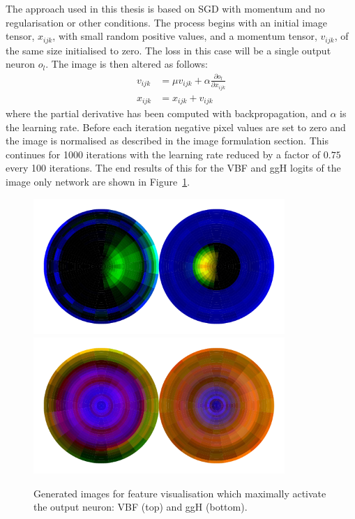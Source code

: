 The approach used in this thesis is based on SGD with momentum and no regularisation or other conditions. 
The process begins with an initial image tensor, $x_{ijk}$, with small random positive values, and a momentum tensor, $v_{ijk}$, of the same size initialised to zero.
The loss in this case will be a single output neuron $o_{l}$. The image is then altered as follows:
\begin{equation}
    \begin{split}
        v_{ijk} &= \mu{}v_{ijk} + \alpha\frac{\partial{o_{l}}}{\partial{x_{ijk}}} \\
        x_{ijk} &= x_{ijk} + v_{ijk}
    \end{split}
\end{equation} 
where the partial derivative has been computed with backpropagation, and $\alpha$ is the learning rate. Before each iteration negative pixel values are set to zero and the image is normalised as described in the image formulation section. This continues for 1000 iterations with the learning rate reduced by a factor of $0.75$ every 100 iterations. 
The end results of this for the VBF and ggH logits of the image only network are shown in Figure~\ref{fig:event_categorisation:feature_vis_vbf_ggh}.
\begin{figure}[h!]
    \centering
    \includegraphics[width=0.85\textwidth]{figures/event_selection/norm_logits1.pdf}
    \includegraphics[width=0.85\textwidth]{figures/event_selection/norm_logits0.pdf}
    \caption{Generated images for feature visualisation which maximally activate the output neuron: VBF (top) and ggH (bottom).}
    \label{fig:event_categorisation:feature_vis_vbf_ggh}
\end{figure}

